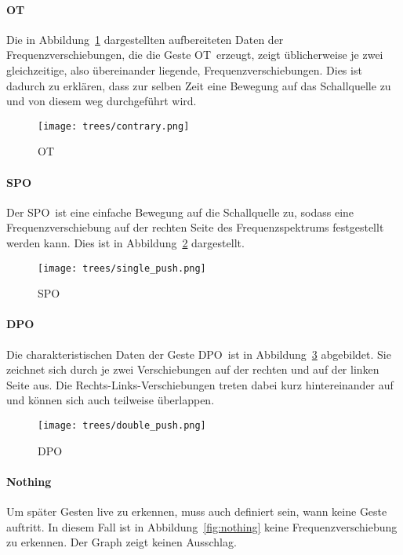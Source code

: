 \paragraph*{\acl{OT}}
Die in Abbildung~\ref{fig:contrary} dargestellten aufbereiteten Daten der Frequenzverschiebungen, die die Geste \glqq \acl{OT}\grqq\ erzeugt, zeigt üblicherweise je zwei gleichzeitige, also übereinander liegende, Frequenzverschiebungen. Dies ist dadurch zu erklären, dass zur selben Zeit eine Bewegung auf das Schallquelle zu und von diesem weg durchgeführt wird.

\begin{figure}[htbp] \centering
\texttt{[image: trees/contrary.png]}
\caption{\acl{OT}}
\label{fig:contrary}
\end{figure}


\paragraph*{\acl{SPO}}
Der \glqq \acl{SPO}\grqq\ ist eine einfache Bewegung auf die Schallquelle zu, sodass eine Frequenzverschiebung auf der rechten Seite des Frequenzspektrums festgestellt werden kann. Dies ist in Abbildung~\ref{fig:single_push} dargestellt.

\begin{figure}[htbp] \centering
\texttt{[image: trees/single\_push.png]}
\caption{\acl{SPO}}
\label{fig:single_push}
\end{figure}

\paragraph*{\acl{DPO}}
Die charakteristischen Daten der Geste \glqq \acl{DPO}\grqq\ ist in Abbildung~\ref{fig:double_push} abgebildet. Sie zeichnet sich durch je zwei Verschiebungen auf der rechten und auf der linken Seite aus. Die Rechts-Links-Verschiebungen treten dabei kurz hintereinander auf und können sich auch teilweise überlappen. 

\begin{figure}[htbp] \centering
\texttt{[image: trees/double\_push.png]}
\caption{\acl{DPO}}
\label{fig:double_push}
\end{figure}

\paragraph*{Nothing}
Um später Gesten live zu erkennen, muss auch definiert sein, wann keine Geste auftritt. In diesem Fall ist in Abbildung~\ref{fig:nothing} keine Frequenzverschiebung zu erkennen. Der Graph zeigt keinen Ausschlag.

